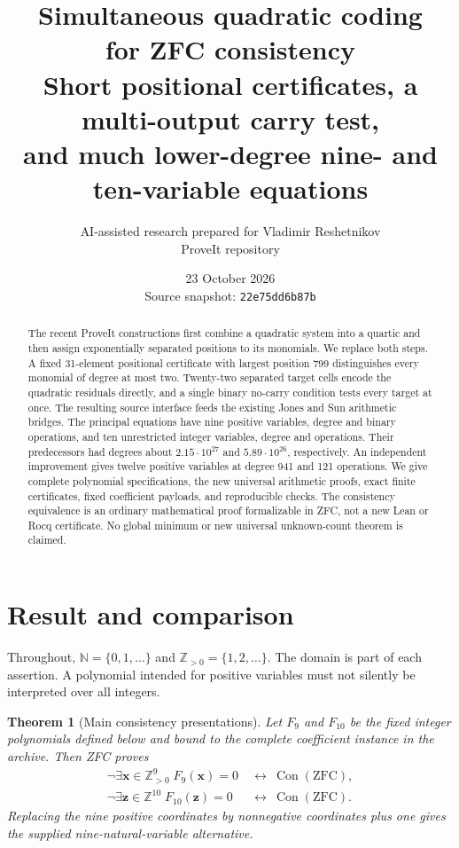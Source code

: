 \documentclass[11pt]{article}
\title{Simultaneous quadratic coding\\for ZFC consistency\\[0.5em]\large Short positional certificates, a multi-output carry test,\\and much lower-degree nine- and ten-variable equations}
\author{AI-assisted research prepared for Vladimir Reshetnikov\\ProveIt repository}
\date{23 October 2026\\\small Source snapshot: \texttt{22e75dd6b87b}}
\newtheorem{theorem}{Theorem}[section]
\newcommand{\N}{\mathbb N}
\newcommand{\Z}{\mathbb Z}
\newcommand{\Pos}{\mathbb Z_{>0}}
\newcommand{\Con}{\operatorname{Con}}
\begin{document}
\maketitle
\begin{abstract}
The recent ProveIt constructions first combine a quadratic system into a
quartic and then assign exponentially separated positions to its monomials.
We replace both steps. A fixed 31-element positional certificate with largest
position 799 distinguishes every monomial of degree at most two. Twenty-two
separated target cells encode the quadratic residuals directly, and a single
binary no-carry condition tests every target at once. The resulting source
interface feeds the existing Jones and Sun arithmetic bridges.
The principal equations have nine positive variables, degree \NineDegree{}
and \NineOps{} binary operations, and ten unrestricted integer variables,
degree \TenDegree{} and \TenOps{} operations. Their predecessors had degrees
about $2.15\cdot10^{27}$ and $5.89\cdot10^{26}$, respectively.
An independent improvement gives twelve positive variables at degree 941
and 121 operations. We give complete polynomial specifications, the new
universal arithmetic proofs, exact finite certificates, fixed coefficient
payloads, and reproducible checks. The consistency equivalence is an ordinary
mathematical proof formalizable in ZFC, not a new Lean or Rocq certificate.
No global minimum or new universal unknown-count theorem is claimed.
\end{abstract}
\tableofcontents
\newpage

\section{Result and comparison}

Throughout, $\N=\{0,1,\ldots\}$ and $\Pos=\{1,2,\ldots\}$.
The domain is part of each assertion. A polynomial intended for positive
variables must not silently be interpreted over all integers.

\begin{theorem}[Main consistency presentations]\label{thm:main}
Let $F_9$ and $F_{10}$ be the fixed integer polynomials defined below and
bound to the complete coefficient instance in the archive. Then ZFC proves
\[
 \begin{aligned}
 \neg\exists\mathbf x\in\Pos^9\;F_9(\mathbf x)=0
 &\ \longleftrightarrow\ \Con(\mathrm{ZFC}),\\
 \neg\exists\mathbf z\in\Z^{10}\;F_{10}(\mathbf z)=0
 &\ \longleftrightarrow\ \Con(\mathrm{ZFC}).
 \end{aligned}
\]
Replacing the nine positive coordinates by nonnegative coordinates plus one
gives the supplied nine-natural-variable alternative.
\end{theorem}
\end{document}
